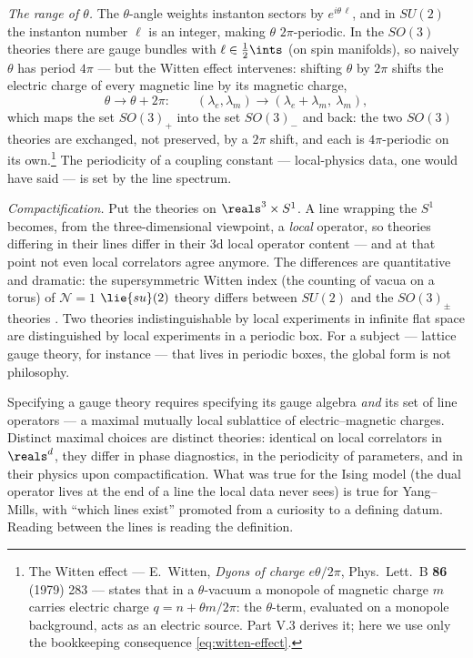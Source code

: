 \emph{The range of $\theta$.} The $\theta$-angle weights instanton
sectors by $e^{i\theta\,\ell}$, and in $SU(2)$ the instanton number
$\ell$ is an integer, making $\theta$ $2\pi$-periodic. In the $SO(3)$
theories there are gauge bundles with $\ell \in \frac12\ints$ (on spin
manifolds), so naively $\theta$ has period $4\pi$ --- but the
Witten effect intervenes: shifting $\theta$ by $2\pi$ shifts the
electric charge of every magnetic line by its magnetic charge,
\begin{equation}
\theta \to \theta + 2\pi: \qquad (\lambda_e, \lambda_m)
\longrightarrow (\lambda_e + \lambda_m,\ \lambda_m),
\label{eq:witten-effect}
\end{equation}
which maps the set $SO(3)_+$ into the set $SO(3)_-$ and back: the two
$SO(3)$ theories are exchanged, not preserved, by a $2\pi$ shift, and
each is $4\pi$-periodic on its own.\footnote{The Witten effect ---
E.~Witten, \emph{Dyons of charge $e\theta/2\pi$}, Phys.\ Lett.\ B
\textbf{86} (1979) 283 --- states that in a $\theta$-vacuum a monopole
of magnetic charge $m$ carries electric charge $q = n + \theta m/2\pi$:
the $\theta$-term, evaluated on a monopole background, acts as an
electric source. Part V.3 derives it; here we use only the bookkeeping
consequence \eqref{eq:witten-effect}.} The periodicity of a coupling
constant --- local-physics data, one would have said --- is set by the
line spectrum.

\emph{Compactification.} Put the theories on $\reals^3 \times S^1$. A
line wrapping the $S^1$ becomes, from the three-dimensional viewpoint, a
\emph{local} operator, so theories differing in their lines differ in
their 3d local operator content --- and at that point not even local
correlators agree anymore. The differences are quantitative and
dramatic: the supersymmetric Witten index (the counting of vacua on a
torus) of $\mathcal{N}=1$ $\lie{su}(2)$ theory differs between $SU(2)$
and the $SO(3)_\pm$ theories . Two theories
indistinguishable by local experiments in infinite flat space are
distinguished by local experiments in a periodic box. For a subject ---
lattice gauge theory, for instance --- that lives in periodic boxes,
the global form is not philosophy.

\begin{iidea}
\label{idea:lines-define}
Specifying a gauge theory requires specifying its gauge algebra
\emph{and} its set of line operators --- a maximal mutually local
sublattice of electric--magnetic charges. Distinct maximal choices are
distinct theories: identical on local correlators in $\reals^d$, they
differ in phase diagnostics, in the periodicity of parameters, and in
their physics upon compactification. What was true for the Ising model
(the dual operator lives at the end of a line the local data never
sees) is true for Yang--Mills, with ``which lines exist'' promoted from
a curiosity to a defining datum. Reading between the lines is reading
the definition.
\end{iidea}

